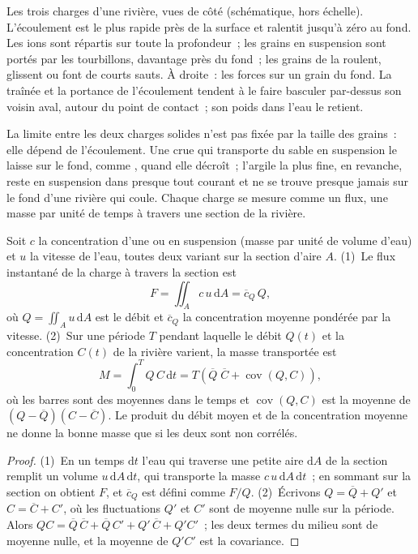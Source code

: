\begin{omfigure}
{\small Les trois charges d'une rivière, vues de côté (schématique, hors
échelle). L'écoulement est le plus rapide près de la surface et ralentit jusqu'à zéro au fond. Les ions
sont répartis sur toute la profondeur~; les grains en suspension sont portés par les tourbillons,
davantage près du fond~; les grains de la  roulent, glissent ou font de courts sauts.
À droite~: les forces sur un grain du fond. La traînée et la portance de l'écoulement tendent à
le faire basculer par-dessus son voisin aval, autour du point de contact~; son poids dans
l'eau le retient.}
\label{fig:b1:erosion-transport:loads}
\end{omfigure}

La limite entre les deux charges solides n'est pas fixée par la taille des grains~: elle
dépend de l'écoulement. Une crue qui transporte du sable en suspension le laisse sur le
fond, comme , quand elle décroît~; l'argile la plus fine, en revanche, reste en
suspension dans presque tout courant et ne se trouve presque jamais sur le fond d'une
rivière qui coule. Chaque charge se mesure comme un flux, une masse par unité de temps à travers une
section de la rivière.

\begin{proposition}\label{prop:b1:erosion-transport:flux}
Soit $c$ la concentration d'une  ou en suspension (masse par unité de
volume d'eau) et $u$ la vitesse de l'eau, toutes deux variant sur la
section d'aire $A$. (1)~Le flux instantané de la charge à travers la
section est
\[
  F = \iint_A c\,u\,\mathrm dA = \overline{c}_Q\,Q,
\]
où $Q = \iint_A u\,\mathrm dA$ est le débit et $\overline{c}_Q$ la
concentration moyenne pondérée par la vitesse. (2)~Sur une période $T$ pendant laquelle le
débit $Q(t)$ et la concentration $C(t)$ de la rivière varient, la masse
transportée est
\[
  M = \int_0^T Q\,C\,\mathrm dt = T\left(\overline{Q}\;\overline{C} +
  \operatorname{cov}(Q, C)\right),
\]
où les barres sont des moyennes dans le temps et $\operatorname{cov}(Q, C)$ est la moyenne
de $(Q - \overline{Q})(C - \overline{C})$. Le produit du débit moyen
et de la concentration moyenne ne donne la bonne masse que si les deux sont
non corrélés.
\end{proposition}

\begin{proof}
(1)~En un temps $\mathrm dt$ l'eau qui traverse une petite aire $\mathrm dA$ de la
section remplit un volume $u\,\mathrm dA\,\mathrm dt$, qui transporte la masse
$c\,u\,\mathrm dA\,\mathrm dt$~; en sommant sur la section on obtient $F$, et
$\overline{c}_Q$ est défini comme $F/Q$. (2)~Écrivons $Q = \overline{Q} + Q'$ et $C =
\overline{C} + C'$, où les fluctuations $Q'$ et $C'$ sont de moyenne nulle sur la
période. Alors $QC = \overline{Q}\,\overline{C} + \overline{Q}\,C' + Q'\,\overline{C}
+ Q'C'$~; les deux termes du milieu sont de moyenne nulle, et la moyenne de $Q'C'$ est la
covariance.
\end{proof}

